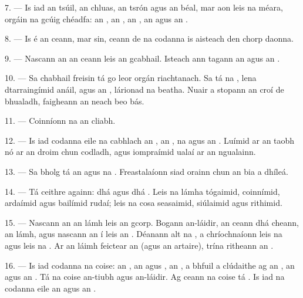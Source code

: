 7. --- Is iad an tsúil, an chluas, an tsrón agus an béal, mar aon leis na méara,
orgáin na gcúig chéadfa: an , an , an
, an  agus an .

8. --- Is é an ceann, mar sin, ceann de na codanna is aisteach den chorp daonna.

\VUsaut{4.4mm}
\VUsaut{3.0mm}

9. --- Nascann an  an ceann leis an gcabhail. Isteach ann tagann an
 agus an .

10. --- Sa chabhail freisin tá go leor orgán riachtanach. Sa  tá na
, lena dtarraingímid anáil, agus an , lárionad na
beatha. Nuair a stopann an croí de bhualadh, faigheann an neach beo bás.

11. --- Coinníonn na  an cliabh.

12. --- Is iad codanna eile na cabhlach an , an , na
 agus an . Luímid ar an taobh nó ar an droim chun
codladh, agus iompraímid ualaí ar an ngualainn.

13. --- Sa bholg tá an  agus na . Freastalaíonn siad
orainn chun an bia a dhíleá.

\VUsaut{4.4mm}
\VUsaut{3.0mm}

14. --- Tá ceithre  againn: dhá  agus dhá
. Leis na lámha tógaimid, coinnímid, ardaímid agus bailímid rudaí;
leis na cosa seasaimid, siúlaimid agus rithimid.

15. --- Nascann an  an lámh leis an gcorp. Bogann
 an-láidir, an ceann dhá cheann, an lámh, agus nascann an
 í leis an . Déanann  alt na
, a chríochnaíonn leis na  agus leis na
. Ar an láimh feictear an  (agus an artaire), trína
ritheann an .

16. --- Is iad codanna na coise: an , an  agus
, an , a bhfuil a  clúdaithe ag
an , an  agus an . Tá
 na coise an-tiubh agus an-láidir. Ag ceann na coise tá
. Is iad na codanna eile an  agus an
.

